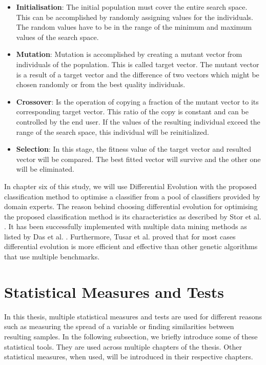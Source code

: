 \begin{itemize}
	\item \textbf{Initialisation}: The initial population must cover the entire search space. This can be accomplished by randomly assigning values for the individuals. The random values have to be in the range of the minimum and maximum values of the search space.
	
	\item \textbf{Mutation}: Mutation is accomplished by creating a mutant vector from individuals of the population. This is called target vector. The mutant vector is a result of a target vector and the difference of two vectors which might be chosen randomly or from the best quality individuals.
	
	\item \textbf{Crossover}: Is the operation of copying a fraction of the mutant vector to its corresponding target vector. This ratio of the copy is constant and can be controlled by the end user. If the values of the resulting individual exceed the range of the search space, this individual will be reinitialized. 
	
	\item \textbf{Selection}: In this stage, the fitness value of the target vector and resulted vector will be compared. The best fitted vector will survive and the other one will be eliminated.
\end{itemize}


In chapter six of this study, we will use Differential Evolution with the proposed classification method to optimise a classifier from a pool of classifiers provided by domain experts. The reason behind choosing differential evolution for optimising the proposed classification method is its characteristics as described by Stor et al. \cite{Storn1997}. It has been successfully implemented with multiple data mining methods as listed by Das et al. \cite{Das2011}. Furthermore, Tusar et al. \cite{Tusar2007} proved that for most cases differential evolution is more efficient and effective than other genetic algorithms that use multiple benchmarks.


\section{Statistical Measures and Tests}

In this thesis, multiple statistical measures and tests are used for different reasons such as measuring the spread of a variable or finding similarities between resulting samples. In the following subsection, we briefly introduce some of these statistical tools. They are used across multiple chapters of the thesis. Other statistical measures, when used, will be introduced in their respective chapters.


